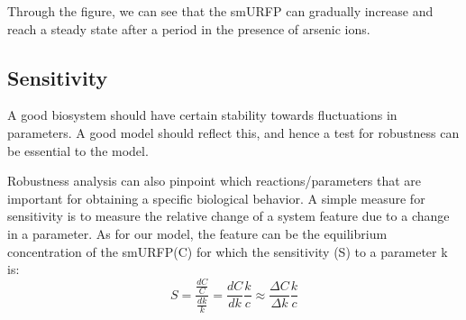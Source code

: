 Through the figure, we can see that the smURFP can gradually increase and reach a steady state after a period in the presence of arsenic ions.

\subsection{Sensitivity }
A good biosystem should have certain stability towards fluctuations in parameters. A good model should reflect this, and hence a test for robustness can be essential to the model.

Robustness analysis can also pinpoint which reactions/parameters that are important for obtaining a specific biological behavior. A simple measure for sensitivity is to measure the relative change of a system feature due to a change in a parameter. As for our model, the feature can be the equilibrium concentration of the smURFP(C) for which the sensitivity (S) to a parameter k is:
\begin{equation}
	S=\frac{\frac{dC}{C}}{\frac{dk}{k}}=\frac{dC}{dk}\frac{k}{c}\approx \frac{\Delta C}{\Delta k}\frac{k}{c}
\end{equation}
